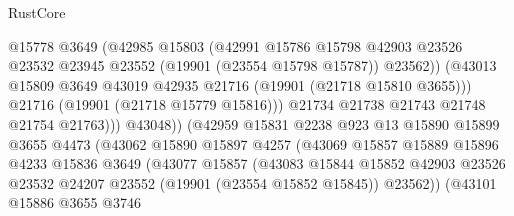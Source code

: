 \begin{lexlean}{RustCore}
\begin{coremodule}
                                  @15778
                                  @3649
                                  (@42985
                                    @15803
                                    (@42991
                                      @15786
                                      @15798
                                      @42903
                                      @23526
                                      @23532
                                      @23945
                                      @23552
                                      (@19901 (@23554 @15798 @15787))
                                      @23562))
                                  (@43013
                                    @15809
                                    @3649
                                    @43019
                                    @42935
                                    @21716
                                    (@19901 (@21718 @15810 @3655)))
                                  @21716
                                  (@19901 (@21718 @15779 @15816)))
                                @21734
                                @21738
                                @21743
                                @21748
                                @21754
                                @21763)))
                          @43048))
                      (@42959
                        @15831
                        @2238
                        @923
                        @13
                        @15890
                        @15899
                        @3655
                        @4473
                        (@43062
                          @15890
                          @15897
                          @4257
                          (@43069
                            @15857
                            @15889
                            @15896
                            @4233
                            @15836
                            @3649
                            (@43077
                              @15857
                              (@43083
                                @15844
                                @15852
                                @42903
                                @23526
                                @23532
                                @24207
                                @23552
                                (@19901 (@23554 @15852 @15845))
                                @23562))
                            (@43101
                              @15886
                              @3655
                              @3746

\end{coremodule}
\end{lexlean}
